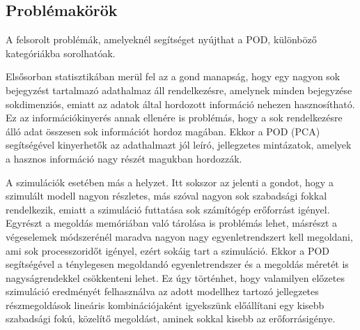        \subsection{Problémakörök}
            A felsorolt problémák, amelyeknél segítséget nyújthat a POD, különböző kategóriákba sorolhatóak.
            \par
            Elsősorban statisztikában merül fel az a gond manapság, hogy egy nagyon sok bejegyzést tartalmazó adathalmaz áll rendelkezésre, amelynek minden bejegyzése sokdimenziós, emiatt az adatok által hordozott információ nehezen hasznosítható. Ez az információkinyerés annak ellenére is problémás, hogy a sok rendelkezésre álló adat összesen sok információt hordoz magában. Ekkor a POD (PCA) segítségével kinyerhetők az adathalmazt jól leíró, jellegzetes mintázatok, amelyek a hasznos információ nagy részét magukban hordozzák.
            \par
            A szimulációk esetében más a helyzet. Itt sokszor az jelenti a gondot, hogy a szimulált modell nagyon részletes, más szóval nagyon sok szabadsági fokkal rendelkezik, emiatt a szimuláció futtatása sok számítógép erőforrást igényel. Egyrészt a megoldás memóriában való tárolása is problémás lehet, másrészt a végeselemek módszerénél maradva nagyon nagy egyenletrendszert kell megoldani, ami sok processzoridőt igényel, ezért sokáig tart a szimuláció. Ekkor a POD segítségével a ténylegesen megoldandó egyenletrendszer és a megoldás méretét is nagyságrendekkel csökkenteni lehet. Ez úgy történhet, hogy valamilyen előzetes szimuláció eredményét felhasználva az adott modellhez tartozó jellegzetes részmegoldások lineáris kombinációjaként igyekszünk előállítani egy kisebb szabadsági fokú, közelítő megoldást, aminek sokkal kisebb az erőforrásigénye.
